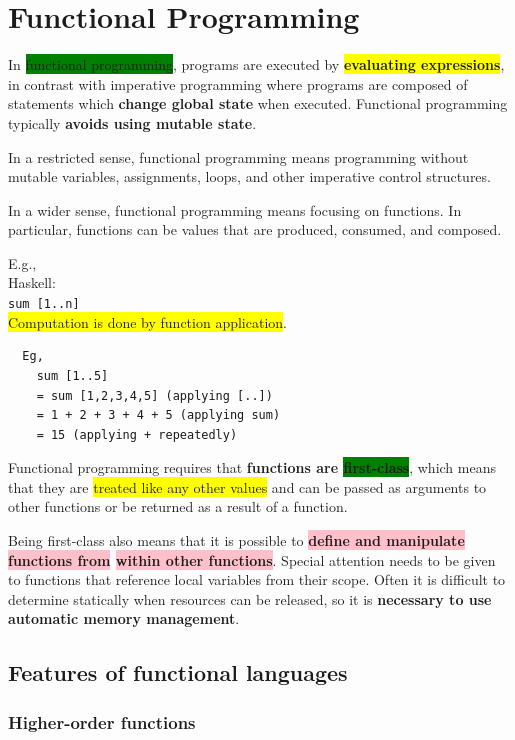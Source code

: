 \documentclass[tikz,border=10pt]{project_plan}
\begin{document}
\section{Functional Programming}

In \colorbox{green}{functional programming}, programs are executed by \colorbox{yellow}{\textbf{evaluating expressions}}, in
contrast with imperative programming where programs are composed of statements
which \textbf{change global state} when executed. Functional programming typically
\textbf{avoids using mutable state}.

In a restricted sense, functional programming means
programming without mutable variables,
assignments, loops, and other imperative control
structures.

In a wider sense, functional programming means
focusing on functions.
In particular, functions can be values that are
produced, consumed, and composed.

E.g.,\\
Haskell:\\
\lstinline|sum [1..n]|\\
\colorbox{yellow}{Computation is done by function application}.\\
\begin{lstlisting}
  Eg,
    sum [1..5]
    = sum [1,2,3,4,5] (applying [..])
    = 1 + 2 + 3 + 4 + 5 (applying sum)
    = 15 (applying + repeatedly)
\end{lstlisting}

Functional programming requires that \textbf{functions are \colorbox{green}{first-class}}, which means
that they are \colorbox{yellow}{treated like any other values} and can be passed as arguments
to other functions or be returned as a result of a function.

Being first-class also means that it is possible to \textbf{\colorbox{pink}{define and manipulate
    functions from} \colorbox{pink}{within other functions}}. Special attention needs to
be given to functions that reference local variables from their scope.
Often it is difficult to determine
statically when resources can be released, so it is \textbf{necessary
  to use automatic memory management}.

\subsection{Features of functional languages}

\subsubsection{Higher-order functions}
\end{document}

